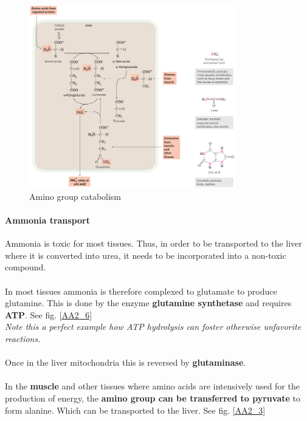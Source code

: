 \documentclass[../main.tex]{subfiles}
\begin{document}
\begin{figure}[H]
	\centering
	\includegraphics[width = 0.8\textwidth]{AA1_2}
	\caption{Amino group catabolism}
	\label{AA1_2}
\end{figure}

\paragraph{Ammonia transport}
Ammonia is toxic for most tissues. Thus, in order to be transported to the liver where it is converted into urea, it needs to be incorporated into a non-toxic compound. \\
\\
In most tissues ammonia is therefore complexed to glutamate to produce glutamine. This is done by the enzyme \textbf{glutamine synthetase} and requires \textbf{ATP}. See fig. \ref{AA2_6} \\
\textit{Note this a perfect example how ATP hydrolysis can foster otherwise unfavorite reactions.}\\
\\
Once in the liver mitochondria this is reversed by \textbf{glutaminase}. \\
\\
In the \textbf{muscle} and other tissues where amino acids are intensively used for the production of energy, the \textbf{amino group can be transferred to pyruvate} to form alanine. Which can be transported to the liver. See fig. \ref{AA2_3}
\end{document}
